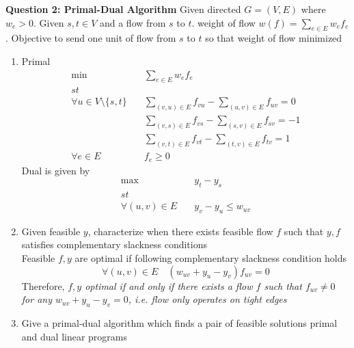\documentclass[11pt]{article}
\begin{document}
$ $\\
\textbf{Question 2: Primal-Dual Algorithm} Given directed $G = (V,E)$ where $w_e > 0$. Given $s,t \in V$ and a flow from $s$ to $t$. weight of flow $w(f) = \textstyle\sum_{e\in E} w_e f_e$. Objective to send one unit of flow from $s$ to $t$ so that weight of flow minimized 

\begin{enumerate}
\item Primal 
\begin{align*}
    \min \quad & \sum_{e\in E} w_e f_e \\ 
    st \quad  & \\
    \forall u\in V \setminus \{s,t\} \quad & \sum_{(v,u)\in E} f_{vu} - \sum_{(u,v)\in E} f_{uv} = 0 \\
    & \sum_{(v,s)\in E} f_{vs} - \sum_{(s,v)\in E} f_{sv} = -1 \\ 
    & \sum_{(v,t)\in E} f_{vt} - \sum_{(t,v)\in E} f_{tv} = 1 \\ 
    \forall e\in E \quad & f_e \geq 0
\end{align*}
Dual is given by 
\begin{align*}
    \max \quad & y_t - y_s \\
    st \quad & \\
    \forall (u,v)\in E \quad &  y_v - y_u \leq w_{uv}
\end{align*}
\item Given feasible $y$, characterize when there exists feasible flow $f$ such that $y,f$ satisfies complementary slackness conditions \\ 
Feasible $f,y$ are optimal if following complementary slackness condition holds
\[
    \forall (u,v)\in E \quad (w_{uv} + y_u - y_v)f_{uv} = 0
\]
Therefore, \textit{ $f,y$ optimal if and only if there exists a flow $f$ such that $f_{uv} \neq 0$ for any $w_{uv}+y_u-y_v = 0$, i.e. flow only operates on tight edges  }

\item Give a primal-dual algorithm which finds a pair of feasible solutions primal and dual linear programs \\


\end{enumerate}
\end{document}
